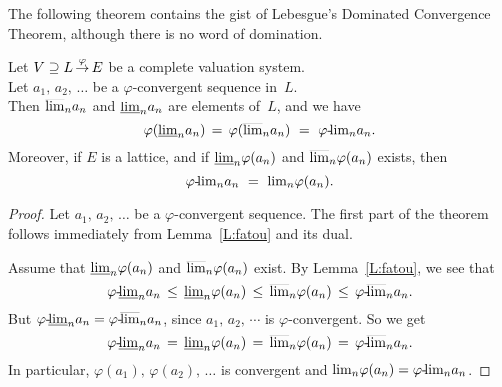 \documentclass[main.tex]{subfiles}
\begin{document}
%
%
\noindent
The following theorem contains the gist
of Lebesgue's Dominated Convergence Theorem,
although there is no word of domination.
\begin{thm}
\label{T:lebesgue}
Let $V \supseteq L\,\smash{\stackrel{\varphi}{\rightarrow}}\,E$ be a complete
valuation system.\\
Let $a_1,\,a_2,\,\dotsc$ be a $\varphi$-convergent
sequence in~$L$. \\
Then $\smash{\overline{\lim}_{n}} a_n$
and $\smash{\underline{\lim}_{n}} a_n$ are elements of~$L$, and we have
\begin{equation*}
\varphi(\llim{n}a_n) \,=\, \varphi(\ulim{n} a_n) 
\ =\ 
\plim\varphi{n} a_n.
\end{equation*}
Moreover,
if $E$ is a lattice,
and if $\smash{\underline{\lim}_{n}}\varphi(a_n)$ and $\smash{\overline{\lim}_{n}}\varphi(a_n)$ exists, 
then
\begin{equation*}
{\varphi}\text{-}\!{\lim}_{n}a_n \ =\ {\lim}_n \varphi(a_n).
\end{equation*}
\end{thm}
\begin{proof}
Let $a_1,\,a_2,\,\dotsc$ be a $\varphi$-convergent sequence.
The first part of the theorem follows immediately from Lemma~\ref{L:fatou}
and its dual.

Assume that $\smash{\underline{\lim}_{n}}\varphi(a_n)$ and $\smash{\overline{\lim}_{n}}\varphi(a_n)$ exist.
By Lemma~\ref{L:fatou}, we see that
\begin{equation*}
{\varphi}\text{-}\!\smash{\underline{\lim}_{n}}a_n \,\leq\,
\smash{\underline{\lim}_{n}}\varphi(a_n) \,\leq\,
\smash{\overline{\lim}_{n}}\varphi(a_n) \,\leq\,
{\varphi}\text{-}\!\smash{\overline{\lim}_{n}}a_n.
\end{equation*}
But ${\varphi}\text{-}\!\smash{\underline{\lim}_{n}}a_n = {\varphi}\text{-}\!\smash{\overline{\lim}_{n}}a_n$,
since $a_1,\,a_2,\,\dotsb$ is $\varphi$-convergent.
So we get 
\begin{equation*}
{\varphi}\text{-}\!\smash{\underline{\lim}_{n}}a_n \,=\,
\smash{\underline{\lim}_{n}}\varphi(a_n) \,=\,
\smash{\overline{\lim}_{n}}\varphi(a_n) \,=\,
{\varphi}\text{-}\!\smash{\overline{\lim}_{n}}a_n.
\end{equation*}
In particular,
$\varphi(a_1),\,\varphi(a_2),\,\dotsc$
is convergent and ${\lim}_n\varphi(a_n) = {\varphi}\text{-}\!{\lim}_{n}a_n$.
\end{proof}
\end{document}
